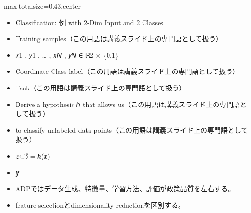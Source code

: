 \clearpage
{}
\begin{minipage}[t]{0.405\textwidth}
\begin{adjustbox}{max totalsize={\textwidth}{0.43\textheight},center}
\begin{minipage}{\textwidth}\scriptsize
{}\begin{itemize}
\item Classification: 例 with 2-Dim Input and 2 Classes
\item Training samples（この用語は講義スライド上の専門語として扱う）
\item 𝑥1 , 𝑦1 , … , 𝑥𝑁 , 𝑦𝑁 ∈ ℝ2 × \{0,1\}
\item Coordinate Class label（この用語は講義スライド上の専門語として扱う）
\item Task（この用語は講義スライド上の専門語として扱う）
\item Derive a hypothesis ℎ that allows us（この用語は講義スライド上の専門語として扱う）
\item to classify unlabeled data points（この用語は講義スライド上の専門語として扱う）
\item ෝ = 𝒉(𝒙)
\item 𝒚
\end{itemize}\begin{itemize}
\item ADPではデータ生成、特徴量、学習方法、評価が政策品質を左右する。
\item feature selectionとdimensionality reductionを区別する。
\end{itemize}
\end{minipage}
\end{adjustbox}
\end{minipage}\hfill
